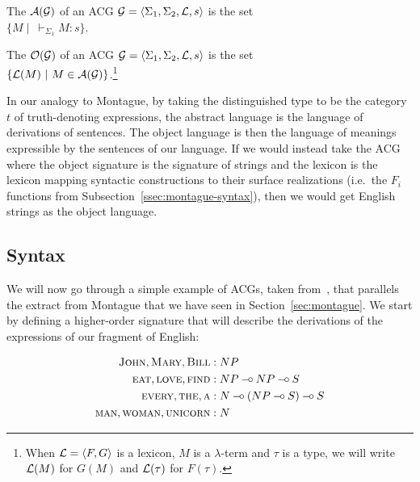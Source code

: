 \begin{definition}
  The  $\mathcal{A}(\mathcal{G})$ of an ACG
  $\mathcal{G} = \left< \Sigma_1, \Sigma_2, \mathcal{L}, s \right>$ is the set \\
  $\{ M \mid \ \vdash_{\Sigma_1} M : s \}$.
\end{definition}

\begin{definition}
  The  $\mathcal{O}(\mathcal{G})$ of an ACG
  $\mathcal{G} = \left< \Sigma_1, \Sigma_2, \mathcal{L}, s \right>$ is the set \\
  $\{ \mathcal{L}(M)\ |\ M \in \mathcal{A}(\mathcal{G}) \}$.\footnote{When
    $\mathcal{L} = \left< F, G \right>$ is a lexicon, $M$ is a $\lambda$-term and
    $\tau$ is a type, we will write $\mathcal{L}(M)$ for $G(M)$ and $\mathcal{L}(\tau)$ for
    $F(\tau)$.}
\end{definition}

In our analogy to Montague, by taking the distinguished type to be the
category $t$ of truth-denoting expressions, the abstract language is the
language of derivations of sentences. The object language is then the
language of meanings expressible by the sentences of our language. If we
would instead take the ACG where the object signature is the signature of
strings and the lexicon is the lexicon mapping syntactic constructions to
their surface realizations (i.e.\ the $F_i$ functions from
Subsection~\ref{ssec:montague-syntax}), then we would get English strings
as the object language.


\subsection{Syntax}
\label{ssec:acg-syntax}

We will now go through a simple example of ACGs, taken
from~\cite{pogodalla2007generalizing}, that parallels the extract from
Montague that we have seen in Section~\ref{sec:montague}. We start by
defining a higher-order signature that will describe the derivations of the
expressions of our fragment of English:

\begin{align*}
  \textsc{John}, \textsc{Mary}, \textsc{Bill} &: NP \\
  \textsc{eat}, \textsc{love}, \textsc{find} &: NP \mathbin{{-}\mkern-3.5mu{\circ}} NP \mathbin{{-}\mkern-3.5mu{\circ}} S \\
  \textsc{every}, \textsc{the}, \textsc{a} &: N \mathbin{{-}\mkern-3.5mu{\circ}} (NP \mathbin{{-}\mkern-3.5mu{\circ}} S) \mathbin{{-}\mkern-3.5mu{\circ}} S \\
  \textsc{man}, \textsc{woman}, \textsc{unicorn} &: N \\
\end{align*}

